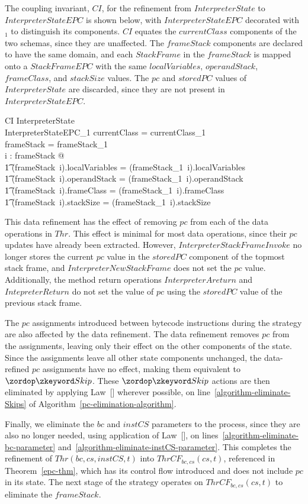 The coupling invariant, $CI$, for the refinement from
$InterpreterState$ to $InterpreterStateEPC$ is shown below, with
$InterpreterStateEPC$ decorated with ${}_1$ to distinguish its
components.
$CI$ equates the $currentClass$ components of the two schemas, since
they are unaffected.
The $frameStack$ components are declared to have the same domain, and
each $StackFrame$ in the $frameStack$ is mapped onto a $StackFrameEPC$
with the same $localVariables$, $operandStack$, $frameClass$, and
$stackSize$ values.
The $pc$ and $storedPC$ values of $InterpreterState$ are discarded,
since they are not present in $InterpreterStateEPC$.
\begin{schema}{CI}
  InterpreterState \\
  InterpreterStateEPC_1
\where
  currentClass = currentClass_1 \\
  \dom frameStack = \dom frameStack_1 \\
  \forall i : \dom frameStack @ \\
  \t1 (frameStack~i).localVariables = (frameStack_1~i).localVariables \land \\
  \t1 (frameStack~i).operandStack = (frameStack_1~i).operandStack \land \\
  \t1 (frameStack~i).frameClass = (frameStack_1~i).frameClass \land \\
  \t1 (frameStack~i).stackSize = (frameStack_1~i).stackSize
\end{schema}

This data refinement has the effect of removing $pc$ from each of the
data operations in $Thr$.
This effect is minimal for most data operations, since their $pc$
updates have already been extracted. 
However, $InterpreterStackFrameInvoke$ no longer stores the current
$pc$ value in the $storedPC$ component of the topmost stack frame, and
$InterpreterNewStackFrame$ does not set the $pc$ value.
Additionally, the method return operations $InterpreterAreturn$ and
$IntepreterReturn$ do not set the value of $pc$ using
the $storedPC$ value of the previous stack frame.

The $pc$ assignments introduced between bytecode instructions during
the strategy are also affected by the data refinement.
The data refinement removes $pc$ from the assignments, leaving only
their effect on the other components of the state.
Since the assignments leave all other state components unchanged, the
data-refined $pc$ assignments have no effect, making them equivalent
to $\Skip$.
These $\Skip$ actions are then eliminated by applying
Law~[] wherever possible, on
line~\ref{algorithm-eliminate-Skips} of
Algorithm~\ref{pc-elimination-algorithm}.

Finally, we eliminate the $bc$ and $instCS$ parameters to the process,
since they are also no longer needed, using application of
Law~[], on
lines~\ref{algorithm-eliminate-bc-parameter}
and~\ref{algorithm-eliminate-instCS-parameter}.
This completes the refinement of $Thr(bc,cs,instCS,t)$ into
$ThrCF_{bc,cs}(cs,t)$, referenced in Theorem~\ref{epc-thm}, which has
its control flow introduced and does not include $pc$ in its state.
The next stage of the strategy operates on $ThrCF_{bc,cs}(cs,t)$ to
eliminate the $frameStack$.
